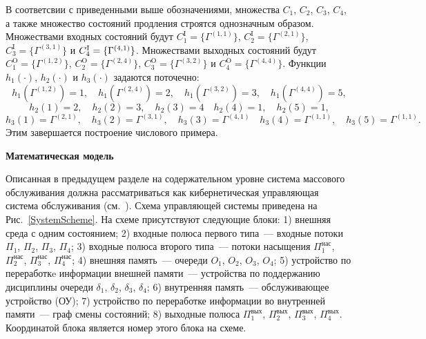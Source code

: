 \documentclass[a4paper,twoside]{article}
\newcommand{\header}[1]{\bigskip\medskip\noindent\textbf{#1}\nopagebreak\bigskip}
\theoremstyle{theorem}
\theoremstyle{remark}
\renewcommand*{\hm}[1]{#1\nobreak\discretionary{}%
	{\hbox{$\mathsurround=0pt #1$}}{}}%
\begin{document}
В соответсвии с приведенными выше обозначениями, множества $C_1$, $C_2$, $C_3$, $C_4$, а также множество состояний продления строятся однозначным образом. Множествами входных состояний будут $C_1^{\mathrm{I}}=\{\Gamma^{(1,1)}\}$, $C_2^{\mathrm{I}}=\{\Gamma^{(2,1)}\}$, $C_3^{\mathrm{I}}=\{\Gamma^{(3,1)}\}$ и $C_4^{\mathrm{I}}\hm=\{\Gamma^{(4,1)}\}$. Множествами выходных состояний будут $C_1^{\mathrm{O}}=\{\Gamma^{(1,2)}\}$, $C_2^{\mathrm{O}}=\{\Gamma^{(2,4)}\}$, $C_3^{\mathrm{O}}=\{\Gamma^{(3,2)}\}$ и $C_4^{\mathrm{O}}=\{\Gamma^{(4,4)}\}$. Функции $h_1(\cdot)$, $h_2(\cdot)$ и $h_3(\cdot)$ задаются поточечно:
\begin{equation*}
h_1(\Gamma^{(1,2)})=1, \quad h_1(\Gamma^{(2,4)})=2, \quad h_1(\Gamma^{(3,2)})=3, \quad h_1(\Gamma^{(4,4)})=5,
\end{equation*}
\begin{equation*}
h_2(1)=2, \quad h_2(2)=3, \quad h_2(3)=4 \quad h_2(4)=1, \quad h_2(5)=1,
\end{equation*}
\begin{equation*}
h_3(1)=\Gamma^{(2,1)}, \quad h_3(2)=\Gamma^{(3,1)}, \quad h_3(3)=\Gamma^{(4,1)} \quad h_3(4)=\Gamma^{(1,1)}, \quad h_3(5)=\Gamma^{(1,1)}.
\end{equation*}
Этим завершается построение числового примера.


\header{Математическая модель}

Описанная в предыдущем разделе на содержательном уровне система массового обслуживания должна рассматриваться как кибернетическая управляющая система обслуживания (см.~\cite{Yablonski}). Схема управляющей системы приведена на Рис.~\ref{SystemScheme}. На схеме присутствуют следующие блоки: 1) внешняя среда с одним состоянием; 2) входные полюса первого типа~--- входные потоки $\Pi_1$, $\Pi_2$, $\Pi_3$, $\Pi_4$; 3) входные полюса второго типа~--- потоки насыщения $\Pi_1^{\mathrm{\text{нас}}}$, $\Pi_2^{\mathrm{\text{нас}}}$, $\Pi_3^{\mathrm{\text{нас}}}$, $\Pi_4^{\mathrm{\text{нас}}}$; 4) внешняя память~--- очереди $O_1$, $O_2$, $O_3$, $O_4$; 5) устройство по переработкe информации внешней памяти~--- устройства по поддержанию дисциплины очереди $\delta_1$, $\delta_2$, $\delta_3$, $\delta_4$; 6) внутренняя память~--- обслуживающее устройство (ОУ); 7) устройство по переработке информации во внутренней памяти~--- граф смены состояний; 8) выходные полюса $\Pi_1^{\mathrm{\text{вых}}}$, $\Pi_2^{\mathrm{\text{вых}}}$, $\Pi_3^{\mathrm{\text{вых}}}$, $\Pi_4^{\mathrm{\text{вых}}}$. Координатой блока является номер этого блока на схеме. 
\end{document}
